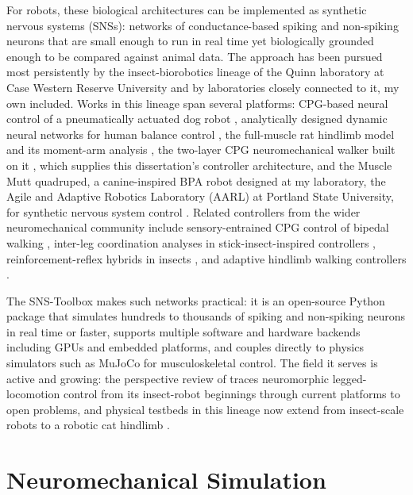 For robots, these biological architectures can be implemented as synthetic nervous systems (SNSs): networks of conductance-based spiking and non-spiking neurons that are small enough to run in real time yet biologically grounded enough to be compared against animal data. The approach has been pursued most persistently by the insect-biorobotics lineage of the Quinn laboratory at Case Western Reserve University and by laboratories closely connected to it, my own included. Works in this lineage span several platforms: CPG-based neural control of a pneumatically actuated dog robot \citep{hunt_development_2017}, analytically designed dynamic neural networks for human balance control \citep{hilts_dynamic_2019}, the full-muscle rat hindlimb model and its moment-arm analysis \citep{young_analyzing_2019}, the two-layer CPG neuromechanical walker built on it \citep{deng_neuromechanical_2019}, which supplies this dissertation's controller architecture, and the Muscle Mutt quadruped, a canine-inspired BPA robot designed at my laboratory, the Agile and Adaptive Robotics Laboratory (AARL) at Portland State University, for synthetic nervous system control \citep{scharzenberger_design_2019}. Related controllers from the wider neuromechanical community include sensory-entrained CPG control of bipedal walking \citep{li_bipedal_2017}, inter-leg coordination analyses in stick-insect-inspired controllers \citep{nourse_analyzing_2019}, reinforcement-reflex hybrids in insects \citep{goldsmith_investigating_2021}, and adaptive hindlimb walking controllers \citep{schilling_adaptive_2022}.

The SNS-Toolbox \citep{nourse_sns_2023} makes such networks practical: it is an open-source Python package that simulates hundreds to thousands of spiking and non-spiking neurons in real time or faster, supports multiple software and hardware backends including GPUs and embedded platforms, and couples directly to physics simulators such as MuJoCo for musculoskeletal control. The field it serves is active and growing: the perspective review of \citet{szczecinski_perspective_2023} traces neuromorphic legged-locomotion control from its insect-robot beginnings through current platforms to open problems, and physical testbeds in this lineage now extend from insect-scale robots to a robotic cat hindlimb \citep{armstead_design_2025}.



\section{Neuromechanical Simulation}\label{sec:bg_neuromech}

